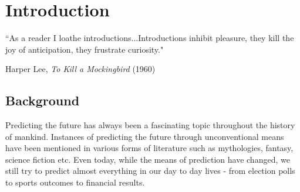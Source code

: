 

\chapter{Introduction} %

\label{Chapter1} %


{``As a reader I loathe introductions...Introductions inhibit pleasure, they kill the joy of
anticipation, they frustrate curiosity."}
\begin{flushright}
Harper Lee, \textit{To Kill a Mockingbird} (1960)
\end{flushright}

\section{Background}
Predicting the future has always been a fascinating topic throughout the history of mankind.
Instances of predicting the future through unconventional means have been mentioned in various
forms of literature such as mythologies, fantasy, science fiction etc. Even today, while the
means of prediction have changed, we still try to predict almost everything in our day to day
lives - from election polls to sports outcomes to financial results.

